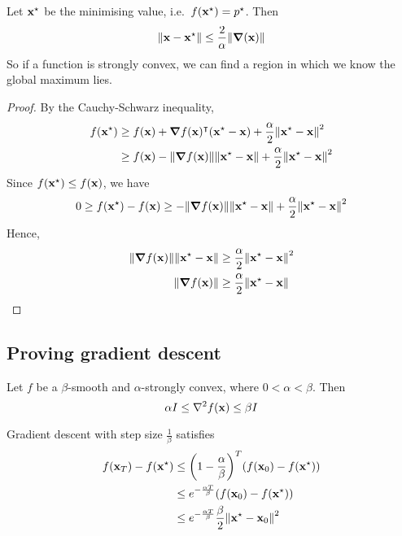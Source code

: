 \begin{claim}
	Let \(\vb x^\star\) be the minimising value, i.e.\ \(f(\vb x^\star) = p^\star\).
	Then
	\[
		\norm{\vb x - \vb x^\star} \leq \frac{2}{\alpha} \norm{\grad(\vb x)}
	\]
	So if a function is strongly convex, we can find a region in which we know the global maximum lies.
\end{claim}
\begin{proof}
	By the Cauchy-Schwarz inequality,
	\begin{align*}
		f(\vb x^\star) & \geq f(\vb x) + \grad{f(\vb x)}^\intercal (\vb x^\star - \vb x) + \frac{\alpha}{2}\norm{\vb x^\star - \vb x}^2  \\
		               & \geq f(\vb x) - \norm{\grad{f(\vb x)}} \norm{\vb x^\star - \vb x} + \frac{\alpha}{2}\norm{\vb x^\star - \vb x}^2
	\end{align*}
	Since \(f(\vb x^\star) \leq f(\vb x)\), we have
	\[
		0 \geq f(\vb x^\star) - f(\vb x) \geq - \norm{\grad{f(\vb x)}} \norm{\vb x^\star - \vb x} + \frac{\alpha}{2}\norm{\vb x^\star - \vb x}^2
	\]
	Hence,
	\begin{align*}
		\norm{\grad{f(\vb x)}} \norm{\vb x^\star - \vb x} & \geq \frac{\alpha}{2}\norm{\vb x^\star - \vb x}^2 \\
		\norm{\grad{f(\vb x)}}                            & \geq \frac{\alpha}{2}\norm{\vb x^\star - \vb x}   \\
	\end{align*}
\end{proof}

\subsection{Proving gradient descent}
Let \(f\) be a \(\beta\)-smooth and \(\alpha\)-strongly convex, where \(0 < \alpha < \beta\).
Then
\[
	\alpha I \leq \laplacian{f(\vb x)} \leq \beta I
\]
\begin{theorem}
	Gradient descent with step size \(\frac{1}{\beta}\) satisfies
	\begin{align*}
		f(\vb x_T) - f(\vb x^\star) & \leq \qty(1 - \frac{\alpha}{\beta})^T \qty(f(\vb x_0) - f(\vb x^\star)) \\&\leq e^{-\frac{\alpha T}{\beta}} \qty(f(\vb x_0) - f(\vb x^\star)) \\&\leq e^{-\frac{\alpha T}{\beta}} \frac{\beta}{2} \norm{\vb x^\star - \vb x_0}^2
	\end{align*}
\end{theorem}

